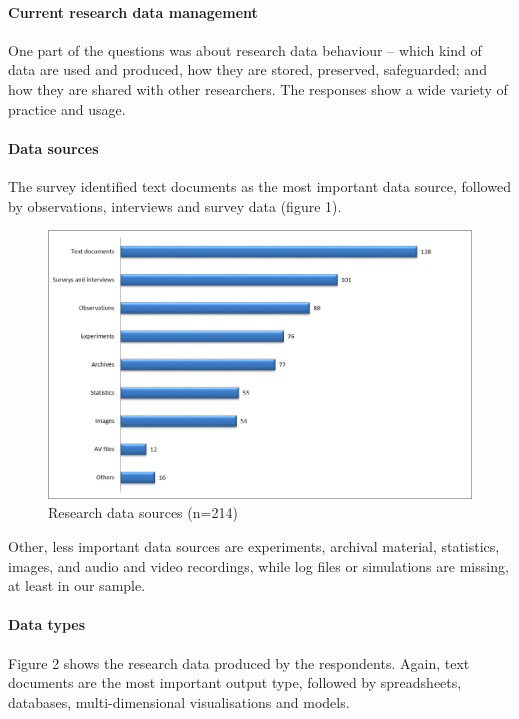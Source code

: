 \documentclass[a4paper,
fontsize=11pt,
oneside,
numbers=noperiodatend,
parskip=half-,
bibliography=totoc,
final
]{scrartcl}
\begin{document}
\paragraph{Current research data
management}\label{current-research-data-management}

One part of the questions was about research data behaviour -- which
kind of data are used and produced, how they are stored, preserved,
safeguarded; and how they are shared with other researchers. The
responses show a wide variety of practice and usage.

\paragraph{Data sources}\label{data-sources}

The survey identified text documents as the most important data source,
followed by observations, interviews and survey data (figure 1).

\begin{figure}[htbp]
\centering
\includegraphics{figures/media/image1.png}
\caption{Research data sources (n=214)}
\end{figure}

Other, less important data sources are experiments, archival material,
statistics, images, and audio and video recordings, while log files or
simulations are missing, at least in our sample.

\paragraph{Data types}\label{data-types}

Figure 2 shows the research data produced by the respondents. Again,
text documents are the most important output type, followed by
spreadsheets, databases, multi-dimen\-sional visualisations and models.
\end{document}
